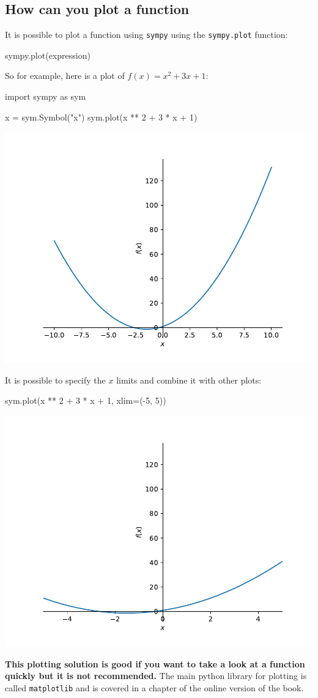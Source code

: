 \subsection{How can you plot a function}
\label{\detokenize{tools-for-mathematics/03-calculus/why/main:how-can-you-plot-a-function}}

It is possible to plot a function using \texttt{sympy} using the \texttt{sympy.plot} function:


\begin{api}
sympy.plot(expression)
\end{api}



So for example, here is a plot of \(f(x)=x^2 + 3x + 1\):





\begin{pyin}
import sympy as sym

x = sym.Symbol("x")
sym.plot(x ** 2 + 3 * x + 1)
\end{pyin}


\begin{center}
    \includegraphics[width=.7\textwidth]{./assets/plotting_with_sympy/main.pdf}
\end{center}

It is possible to specify the \(x\) limits and combine it with other plots:

\begin{pyin}
sym.plot(x ** 2 + 3 * x + 1, xlim=(-5, 5))
\end{pyin}

\begin{center}
    \includegraphics[width=.7\textwidth]{./assets/plotting_with_sympy_with_xlim/main.pdf}
\end{center}




\textbf{This plotting solution is good if you want to take a look at a function
quickly but it is not recommended.} The main python library for plotting is called
\texttt{matplotlib} and is covered in a chapter of the online version of the
book.
